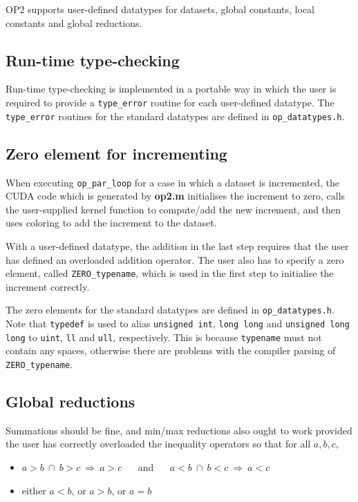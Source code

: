 \documentclass[12pt]{article}
\begin{document}
OP2 supports user-defined datatypes for datasets, global constants, local constants 
and global reductions.

\subsection{Run-time type-checking}


Run-time type-checking is implemented in a portable way in which the user 
is required to provide a {\tt type\_error} routine for each user-defined 
datatype.  The {\tt type\_error} routines for the standard datatypes are 
defined in {\tt op\_datatypes.h}.  

\subsection{Zero element for incrementing}

When executing {\tt op\_par\_loop} for a case in which a dataset is 
incremented, the CUDA code which is generated by {\bf op2.m} 
initialises the increment to zero, calls the user-supplied kernel
function to compute/add the new increment, and then uses coloring to 
add the increment to the dataset.

With a user-defined datatype, the addition in the last step requires
that the user has defined an overloaded addition operator.  The user
also has to specify a zero element, called {\tt ZERO\_typename},
which is used in the first step to initialise the increment correctly.

The zero elements for the standard datatypes are defined in 
{\tt op\_datatypes.h}.  Note that {\tt typedef} is used to alias 
{\tt unsigned int}, {\tt long long} and {\tt unsigned long long} to 
{\tt uint}, {\tt ll} and {\tt ull}, respectively.  This is because 
{\tt typename} must not contain any spaces, otherwise there are problems
with the compiler parsing of {\tt ZERO\_typename}.

\subsection{Global reductions}

Summations should be fine, and min/max reductions also ought to work 
provided the user has correctly overloaded the inequality operators 
so that for all $a, b, c$, 
\begin{itemize}
\item\vspace*{-0.1in} $a\!>\!b\ \cap\ b\!>\!c\ \Longrightarrow\ a\!>\!c$ 
           ~~ and ~~   $a\!<\!b\ \cap\ b\!<\!c\ \Longrightarrow\ a\!<\!c$ 
\item\vspace*{-0.1in}  either $a\!<\!b$, or $a\!>\!b$, or $a\!=\!b$
\end{itemize}
\end{document}
